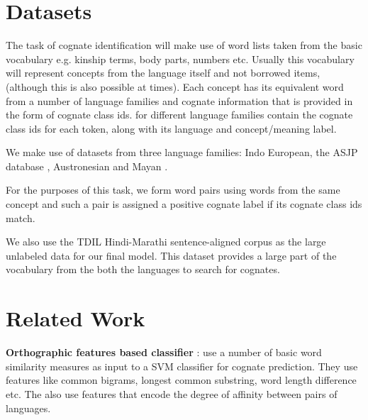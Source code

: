 \documentclass[11pt,letterpaper]{article}
\begin{document}
\section{Datasets}

The task of cognate identification will make use of word lists taken from the basic vocabulary e.g. kinship terms, body parts, numbers etc. Usually this vocabulary will represent concepts from the language itself and not borrowed items, (although this is also possible at times). Each concept has its equivalent word from a number of language families and cognate information that is provided in the form of cognate class ids.
for different language families contain the cognate class ids for each token, along with its language and concept/meaning label. 

We make use of datasets from three language families: Indo European, the ASJP database \cite{wichmannASJP:2016}, Austronesian \cite{greenhillBlust:08} and Mayan \cite{wichmann:2008}. 




For the purposes of this task, we form word pairs using words from the same concept and such a pair is assigned a positive cognate label if its cognate class ids match.


We also use the TDIL Hindi-Marathi sentence-aligned corpus as the large unlabeled data for our final model. This dataset provides a large part of the vocabulary from the both the languages to search for cognates.

\section{Related Work}
\textbf{Orthographic features based classifier} : \citet{hauer2011clustering} use a number of basic word similarity measures as input to a SVM classifier for cognate prediction. They use features like common bigrams, longest common substring, word length difference etc. The also use features that encode the degree of affinity between pairs of languages.
\end{document}
